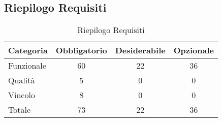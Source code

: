 \subsection{Riepilogo Requisiti}{ 
\renewcommand*{\arraystretch}{1.4} 
\begin{table}[h] 
 \begin{center} 
\begin{tabular}[c]{| p{2.5cm} | c | c | c |}  
\hline \textbf{Categoria} & \textbf{Obbligatorio} & \textbf{Desiderabile} & \textbf{Opzionale} \\ \hline 
Funzionale & 60 & 22 & 36\\ 
 \hline 
Qualità & 5 & 0 & 0\\ 
 \hline 
Vincolo & 8 & 0 & 0\\ 
 \hline 
Totale & 73 & 22 & 36\\ 
 \hline 
\end{tabular} 
 \caption{Riepilogo Requisiti\label{tab:riepilogo}}\end{center} 
 \end{table}}